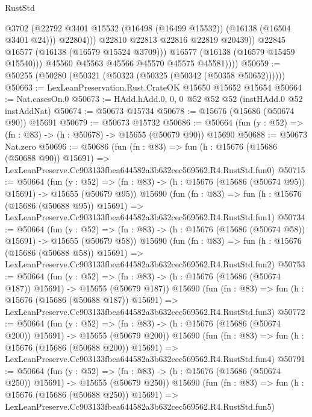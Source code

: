 \begin{lexlean}{RustStd}
\begin{coremodule}
                          @3702
                          (@22792 @3401 @15532 (@16498 (@16499 @15532)) (@16138 (@16504 @3401 @24)))
                          @22804)))
                    @22810
                    @22813
                    @22816
                    @22819
                    @20439))
                @22845
                @16577
                (@16138 (@16579 @15524 @3709)))
              @16577
              (@16138 (@16579 @15459 @15540)))
            @45560
            @45563
            @45566
            @45570
            @45575
            @45581))))
@50659 := @50255 (@50280 (@50321 (@50323 (@50325 (@50342 (@50358 @50652))))))
@50663 := LexLeanPreservation.Rust.CrateOK @15650 @15652 @15654
@50664 := Nat.casesOn.{0}
@50673 := HAdd.hAdd.{0, 0, 0} @52 @52 @52 (instHAdd.{0} @52 instAddNat)
@50674 := @50673 @15734
@50678 := @15676 (@15686 (@50674 @90)) @15691
@50679 := @50673 @15732
@50686 := @50664 (fun (y : @52) => (fn : @83) -> (h : @50678) -> @15655 (@50679 @90)) @15690
@50688 := @50673 Nat.zero
@50696 := @50686
    (fun (fn : @83) =>
    fun (h : @15676 (@15686 (@50688 @90)) @15691) =>
    LexLeanPreserve.Cc903133fbea644582a3b632cec569562.R4.RustStd.fun0)
@50715 := @50664
    (fun (y : @52) =>
    (fn : @83) -> (h : @15676 (@15686 (@50674 @95)) @15691) -> @15655 (@50679 @95))
    @15690
    (fun (fn : @83) =>
    fun (h : @15676 (@15686 (@50688 @95)) @15691) =>
    LexLeanPreserve.Cc903133fbea644582a3b632cec569562.R4.RustStd.fun1)
@50734 := @50664
    (fun (y : @52) =>
    (fn : @83) -> (h : @15676 (@15686 (@50674 @58)) @15691) -> @15655 (@50679 @58))
    @15690
    (fun (fn : @83) =>
    fun (h : @15676 (@15686 (@50688 @58)) @15691) =>
    LexLeanPreserve.Cc903133fbea644582a3b632cec569562.R4.RustStd.fun2)
@50753 := @50664
    (fun (y : @52) =>
    (fn : @83) -> (h : @15676 (@15686 (@50674 @187)) @15691) -> @15655 (@50679 @187))
    @15690
    (fun (fn : @83) =>
    fun (h : @15676 (@15686 (@50688 @187)) @15691) =>
    LexLeanPreserve.Cc903133fbea644582a3b632cec569562.R4.RustStd.fun3)
@50772 := @50664
    (fun (y : @52) =>
    (fn : @83) -> (h : @15676 (@15686 (@50674 @200)) @15691) -> @15655 (@50679 @200))
    @15690
    (fun (fn : @83) =>
    fun (h : @15676 (@15686 (@50688 @200)) @15691) =>
    LexLeanPreserve.Cc903133fbea644582a3b632cec569562.R4.RustStd.fun4)
@50791 := @50664
    (fun (y : @52) =>
    (fn : @83) -> (h : @15676 (@15686 (@50674 @250)) @15691) -> @15655 (@50679 @250))
    @15690
    (fun (fn : @83) =>
    fun (h : @15676 (@15686 (@50688 @250)) @15691) =>
    LexLeanPreserve.Cc903133fbea644582a3b632cec569562.R4.RustStd.fun5)

\end{coremodule}
\end{lexlean}
